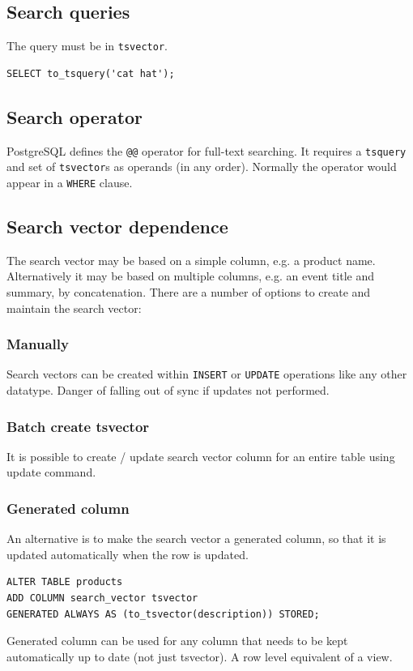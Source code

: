 \documentclass{pgnotes}
\begin{document}
\subsection{Search queries}

The query must be in \texttt{tsvector}.
\begin{verbatim}
SELECT to_tsquery('cat hat');
\end{verbatim}


\subsection{Search operator}

PostgreSQL defines the \texttt{@@} operator for full-text searching.
It requires a \texttt{tsquery} and set of \texttt{tsvector}s as operands (in any order).
Normally the operator would appear in a \texttt{WHERE} clause.

\subsection{Search vector dependence}

The search vector may be based on a simple column, e.g. a product name.
Alternatively it may be based on multiple columns, e.g. an event title and summary, by concatenation. 
There are a number of options to create and maintain the search vector:

\subsubsection{Manually}

Search vectors can be created within \texttt{INSERT} or \texttt{UPDATE} operations like any other datatype.
Danger of falling out of sync if updates not performed.

\subsubsection{Batch create tsvector}

It is possible to create / update search vector column for an entire table using update command.

\subsubsection{Generated column}

An alternative is to make the search vector a generated column, so that it is updated automatically when the row is updated.
\begin{verbatim}
ALTER TABLE products
ADD COLUMN search_vector tsvector
GENERATED ALWAYS AS (to_tsvector(description)) STORED; 
\end{verbatim}
Generated column can be used for any column that needs to be kept automatically up to date (not just tsvector).
A row level equivalent of a view.
\end{document}
